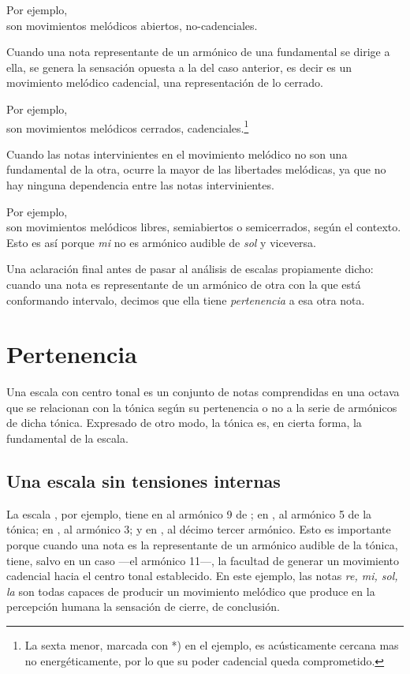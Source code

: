 \documentclass[a4paper,12pt]{article}
\begin{document}
\begin{multicols}{2}
  Por ejemplo, \\   son movimientos melódicos abiertos, no-cadenciales.

  Cuando una nota representante de un armónico de una fundamental se dirige a ella, se genera la sensación opuesta a la del caso anterior, es decir es un movimiento melódico cadencial, una representación de lo cerrado.

  Por ejemplo, \\  son movimientos melódicos cerrados, cadenciales.\footnote{La sexta menor, marcada con *) en el ejemplo, es acústicamente cercana mas no energéticamente, por lo que su poder cadencial queda comprometido.}

  Cuando las notas intervinientes en el movimiento melódico no son una fundamental de la otra, ocurre la mayor de las libertades melódicas, ya que no hay ninguna dependencia entre las notas intervinientes.

  Por ejemplo, \\   son movimientos melódicos libres, semiabiertos o semicerrados, según el contexto. Esto es así porque \emph{mi} no es armónico audible de \emph{sol} y viceversa.

  Una aclaración final antes de pasar al análisis de escalas propiamente dicho: cuando una nota es representante de un armónico de otra con la que está conformando intervalo, decimos que ella tiene \emph{pertenencia} a esa otra nota.

\section{Pertenencia}\label{sec:pertenencia}
  Una escala con centro tonal es un conjunto de notas comprendidas en una octava que se relacionan con la tónica según su pertenencia o no a la serie de armónicos de dicha tónica. Expresado de otro modo, la tónica es, en cierta forma, la fundamental de la escala.

    \subsection{Una escala sin tensiones internas}\label{subsec:escala-sin-tensiones}
    La escala \hbox{,} por ejemplo, tiene en  al armónico 9 de \hbox{;} en \hbox{,} al armónico 5 de la tónica; en \hbox{,} al armónico 3; y en \hbox{,} al décimo tercer armónico. Esto es importante porque cuando una nota es la representante de un armónico audible de la tónica, tiene, salvo en un caso ---el armónico 11---, la facultad de generar un movimiento cadencial hacia el centro tonal establecido. En este ejemplo, las notas \emph{re, mi, sol, la} son todas capaces de producir un movimiento melódico que produce en la percepción humana la sensación de cierre, de conclusión.
\end{multicols}
\end{document}
